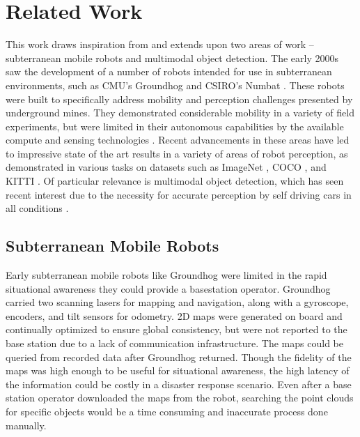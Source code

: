 
\section{Related Work}

This work draws inspiration from and extends upon two areas of work -- subterranean mobile robots and multimodal object detection. The early 2000s saw the development of a number of robots intended for use in subterranean environments, such as CMU's Groundhog \cite{ferguson2004autonomous} and CSIRO's Numbat \cite{ralston1998numbat}. These robots were built to specifically address mobility and perception challenges presented by underground mines. They demonstrated considerable mobility in a variety of field experiments, but were limited in their autonomous capabilities by the available compute and sensing technologies \cite{morris2006recent}. Recent advancements in these areas have led to impressive state of the art results in a variety of areas of robot perception, as demonstrated in various tasks on datasets such as ImageNet \cite{deng2009imagenet}, COCO \cite{lin2014microsoft}, and KITTI \cite{Geiger2013IJRR}. Of particular relevance is multimodal object detection, which has seen recent interest due to the necessity for accurate perception by self driving cars in all conditions \cite{feng2019deep}.

\subsection{Subterranean Mobile Robots}

Early subterranean mobile robots like Groundhog were limited in the rapid situational awareness they could provide a basestation operator. Groundhog carried two scanning lasers for mapping and navigation, along with a gyroscope, encoders, and tilt sensors for odometry. 2D maps were generated on board and continually optimized to ensure global consistency, but were not reported to the base station due to a lack of communication infrastructure. The maps could be queried from recorded data after Groundhog returned. Though the fidelity of the maps was high enough to be useful for situational awareness, the high latency of the information could be costly in a disaster response scenario. Even after a base station operator downloaded the maps from the robot, searching the point clouds for specific objects would be a time consuming and inaccurate process done manually.

